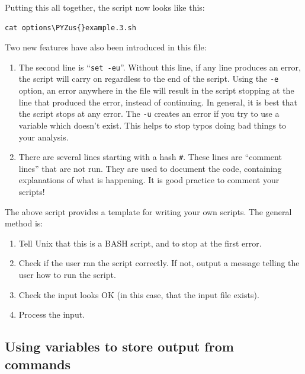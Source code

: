 \documentclass[11pt]{article}
\makeatletter
\providecommand{\tightlist}{%
      \setlength{\itemsep}{0pt}\setlength{\parskip}{0pt}}
\def\PYZus{\char`\_}
\newcommand{\boxspacing}{\kern\kvtcb@left@rule\kern\kvtcb@boxsep}
\newcommand{\prompt}[4]{
        {\ttfamily\llap{{\color{blue}\LARGE\faKeyboardO\hspace{3pt}#4}}\vspace{-\baselineskip}}
    }
\makeatother
\begin{document}
Putting this all together, the script now looks like this:

    \begin{tcolorbox}[breakable, size=fbox, boxrule=1pt, pad at break*=1mm,colback=cellbackground, colframe=cellborder]
\prompt{In}{incolor}{ }{\boxspacing}
\begin{Verbatim}[commandchars=\\\{\}]
cat options\PYZus{}example.3.sh
\end{Verbatim}
\end{tcolorbox}

    Two new features have also been introduced in this file:

\begin{enumerate}
\def\labelenumi{\arabic{enumi}.}
\tightlist
\item
  The second line is ``\texttt{set\ -eu}''. Without this line, if any
  line produces an error, the script will carry on regardless to the end
  of the script. Using the \texttt{-e} option, an error anywhere in the
  file will result in the script stopping at the line that produced the
  error, instead of continuing. In general, it is best that the script
  stops at any error. The \texttt{-u} creates an error if you try to use
  a variable which doesn't exist. This helps to stop typos doing bad
  things to your analysis.
\item
  There are several lines starting with a hash \texttt{\#}. These lines
  are ``comment lines'' that are not run. They are used to document the
  code, containing explanations of what is happening. It is good
  practice to comment your scripts!
\end{enumerate}

The above script provides a template for writing your own scripts. The
general method is:

\begin{enumerate}
\def\labelenumi{\arabic{enumi}.}
\tightlist
\item
  Tell Unix that this is a BASH script, and to stop at the first error.
\item
  Check if the user ran the script correctly. If not, output a message
  telling the user how to run the script.
\item
  Check the input looks OK (in this case, that the input file exists).
\item
  Process the input.
\end{enumerate}

\hypertarget{using-variables-to-store-output-from-commands}{%
\subsection{Using variables to store output from
commands}\label{using-variables-to-store-output-from-commands}}
\end{document}
